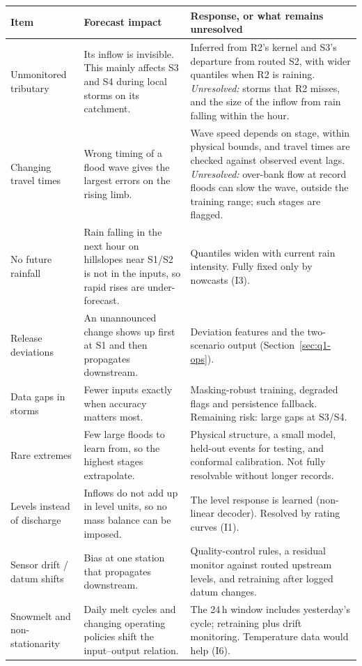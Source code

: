 {\small
\begin{longtable}{@{}p{}p{}p{}@{}}
\toprule
Item & Forecast impact & Response, or what remains unresolved \\ \midrule
\endhead
Unmonitored tributary & Its inflow is invisible. This mainly affects S3 and S4 during local storms on its catchment. & Inferred from R2's kernel and S3's departure from routed S2, with wider quantiles when R2 is raining. \emph{Unresolved:} storms that R2 misses, and the size of the inflow from rain falling within the hour. \\
Changing travel times & Wrong timing of a flood wave gives the largest errors on the rising limb. & Wave speed depends on stage, within physical bounds, and travel times are checked against observed event lags. \emph{Unresolved:} over-bank flow at record floods can slow the wave, outside the training range; such stages are flagged. \\
No future rainfall & Rain falling in the next hour on hillslopes near S1/S2 is not in the inputs, so rapid rises are under-forecast. & Quantiles widen with current rain intensity. Fully fixed only by nowcasts (I3). \\
Release deviations & An unannounced change shows up first at S1 and then propagates downstream. & Deviation features and the two-scenario output (Section~\ref{sec:q1-ops}). \\
Data gaps in storms & Fewer inputs exactly when accuracy matters most. & Masking-robust training, degraded flags and persistence fallback. Remaining risk: large gaps at S3/S4. \\
Rare extremes & Few large floods to learn from, so the highest stages extrapolate. & Physical structure, a small model, held-out events for testing, and conformal calibration. Not fully resolvable without longer records. \\
Levels instead of discharge & Inflows do not add up in level units, so no mass balance can be imposed. & The level response is learned (non-linear decoder). Resolved by rating curves (I1). \\
Sensor drift / datum shifts & Bias at one station that propagates downstream. & Quality-control rules, a residual monitor against routed upstream levels, and retraining after logged datum changes. \\
Snowmelt and non-stationarity & Daily melt cycles and changing operating policies shift the input--output relation. & The 24\,h window includes yesterday's cycle; retraining plus drift monitoring. Temperature data would help (I6). \\
\bottomrule
\end{longtable}
}

